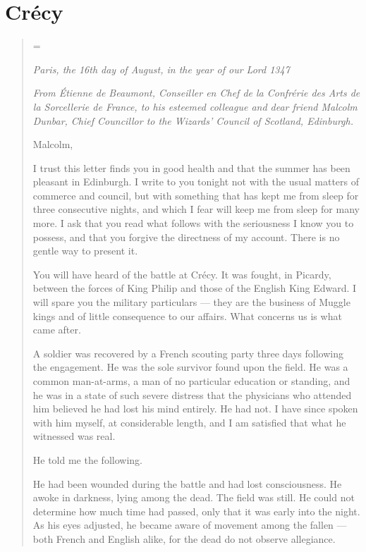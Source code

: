 
\chapter{Crécy}

\begin{quote}
\parskip=\baselineskip

\begin{flushright}
\textit{Paris, the 16th day of August, in the year of our Lord 1347}
\end{flushright}

\bigskip

\textit{From Étienne de Beaumont, Conseiller en Chef de la Confrérie des Arts de la Sorcellerie de France, to his esteemed colleague and dear friend Malcolm Dunbar, Chief Councillor to the Wizards' Council of Scotland, Edinburgh.}

\bigskip

Malcolm,


I trust this letter finds you in good health and that the summer has been pleasant in Edinburgh. I write to you tonight not with the usual matters of commerce and council, but with something that has kept me from sleep for three consecutive nights, and which I fear will keep me from sleep for many more. I ask that you read what follows with the seriousness I know you to possess, and that you forgive the directness of my account. There is no gentle way to present it.

You will have heard of the battle at Crécy. It was fought, in Picardy, between the forces of King Philip and those of the English King Edward. I will spare you the military particulars --- they are the business of Muggle kings and of little consequence to our affairs. What concerns us is what came after.

A soldier was recovered by a French scouting party three days following the engagement. He was the sole survivor found upon the field. He was a common man-at-arms, a man of no particular education or standing, and he was in a state of such severe distress that the physicians who attended him believed he had lost his mind entirely. He had not. I have since spoken with him myself, at considerable length, and I am satisfied that what he witnessed was real.

He told me the following.

He had been wounded during the battle and had lost consciousness. He awoke in darkness, lying among the dead. The field was still. He could not determine how much time had passed, only that it was early into the night. As his eyes adjusted, he became aware of movement among the fallen --- both French and English alike, for the dead do not observe allegiance.


\end{quote}
